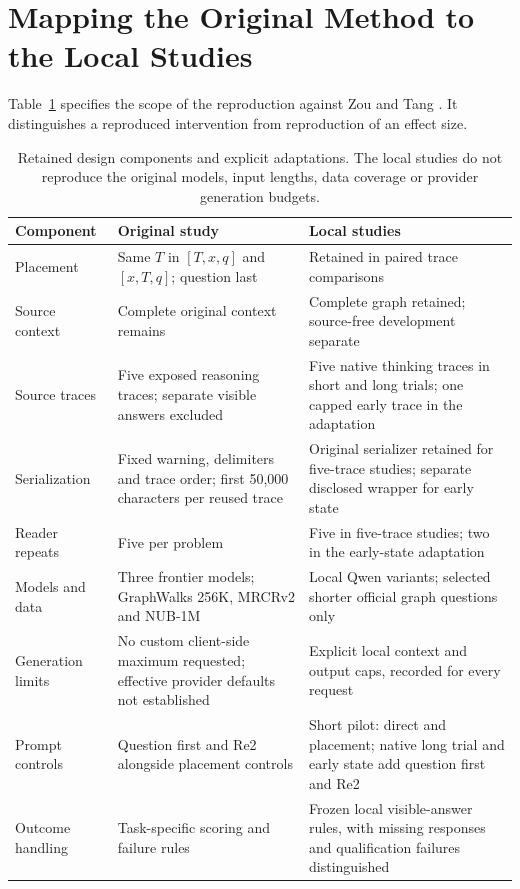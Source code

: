 \section{Mapping the Original Method to the Local Studies}
\label{app:reproduction-map}
Table~\ref{tab:reproduction-map} specifies the scope of the reproduction against Zou and Tang \citep{tang2026trace}. It distinguishes a reproduced intervention from reproduction of an effect size.

\begin{table}[htbp]
\centering\small
\begin{tabular}{>{\raggedright\arraybackslash}p{.20\linewidth}>{\raggedright\arraybackslash}p{.34\linewidth}>{\raggedright\arraybackslash}p{.36\linewidth}}
\toprule
Component & Original study & Local studies\\
\midrule
Placement & Same $T$ in $[T,x,q]$ and $[x,T,q]$; question last & Retained in paired trace comparisons\\
Source context & Complete original context remains & Complete graph retained; source-free development separate\\
Source traces & Five exposed reasoning traces; separate visible answers excluded & Five native thinking traces in short and long trials; one capped early trace in the adaptation\\
Serialization & Fixed warning, delimiters and trace order; first 50,000 characters per reused trace & Original serializer retained for five-trace studies; separate disclosed wrapper for early state\\
Reader repeats & Five per problem & Five in five-trace studies; two in the early-state adaptation\\
Models and data & Three frontier models; GraphWalks 256K, MRCRv2 and NUB-1M & Local Qwen variants; selected shorter official graph questions only\\
Generation limits & No custom client-side maximum requested; effective provider defaults not established & Explicit local context and output caps, recorded for every request\\
Prompt controls & Question first and Re2 alongside placement controls & Short pilot: direct and placement; native long trial and early state add question first and Re2\\
Outcome handling & Task-specific scoring and failure rules & Frozen local visible-answer rules, with missing responses and qualification failures distinguished\\
\bottomrule
\end{tabular}
\caption{Retained design components and explicit adaptations. The local studies do not reproduce the original models, input lengths, data coverage or provider generation budgets.}
\label{tab:reproduction-map}
\end{table}

